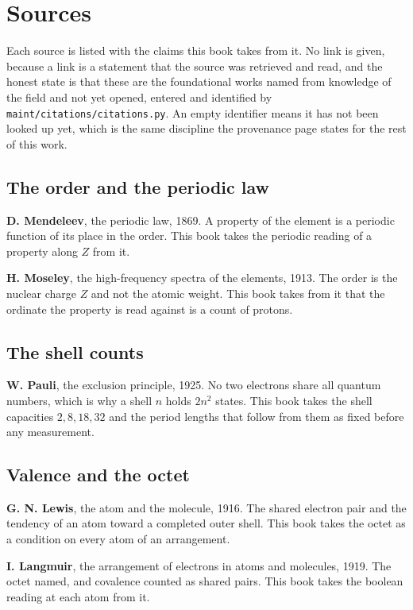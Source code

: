 \chapter{Sources}

Each source is listed with the claims this book takes from it. No link is given, because a link is a
statement that the source was retrieved and read, and the honest state is that these are the
foundational works named from knowledge of the field and not yet opened, entered and identified by
\texttt{maint/citations/citations.py}. An empty identifier means it has not been looked up yet, which
is the same discipline the provenance page states for the rest of this work.

\section*{The order and the periodic law}

\textbf{D. Mendeleev}, the periodic law, 1869. A property of the element is a periodic function of its
place in the order. This book takes the periodic reading of a property along $Z$ from it.

\textbf{H. Moseley}, the high-frequency spectra of the elements, 1913. The order is the nuclear
charge $Z$ and not the atomic weight. This book takes from it that the ordinate the property is read
against is a count of protons.

\section*{The shell counts}

\textbf{W. Pauli}, the exclusion principle, 1925. No two electrons share all quantum numbers, which
is why a shell $n$ holds $2n^2$ states. This book takes the shell capacities $2, 8, 18, 32$ and the
period lengths that follow from them as fixed before any measurement.

\section*{Valence and the octet}

\textbf{G. N. Lewis}, the atom and the molecule, 1916. The shared electron pair and the tendency of
an atom toward a completed outer shell. This book takes the octet as a condition on every atom of an
arrangement.

\textbf{I. Langmuir}, the arrangement of electrons in atoms and molecules, 1919. The octet named, and
covalence counted as shared pairs. This book takes the boolean reading at each atom from it.


